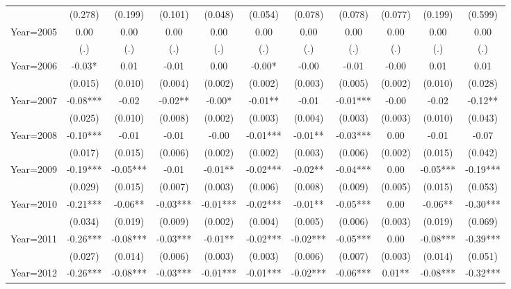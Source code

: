 {\begin{tabular}{l*{10}{c}}
                    &(0.278)   &(0.199)   &(0.101)   &(0.048)   &(0.054)   &(0.078)   &(0.078)   &(0.077)   &(0.199)   &(0.599)   \\
Year=2005           &  0.00   &  0.00   &  0.00   &  0.00   &  0.00   &  0.00   &  0.00   &  0.00   &  0.00   &  0.00   \\
                    &   (.)   &   (.)   &   (.)   &   (.)   &   (.)   &   (.)   &   (.)   &   (.)   &   (.)   &   (.)   \\
Year=2006           & -0.03*  &  0.01   & -0.01   &  0.00   & -0.00*  & -0.00   & -0.01   & -0.00   &  0.01   &  0.01   \\
                    &(0.015)   &(0.010)   &(0.004)   &(0.002)   &(0.002)   &(0.003)   &(0.005)   &(0.002)   &(0.010)   &(0.028)   \\
Year=2007           & -0.08***& -0.02   & -0.02** & -0.00*  & -0.01** & -0.01   & -0.01***& -0.00   & -0.02   & -0.12** \\
                    &(0.025)   &(0.010)   &(0.008)   &(0.002)   &(0.003)   &(0.004)   &(0.003)   &(0.003)   &(0.010)   &(0.043)   \\
Year=2008           & -0.10***& -0.01   & -0.01   & -0.00   & -0.01***& -0.01** & -0.03***&  0.00   & -0.01   & -0.07   \\
                    &(0.017)   &(0.015)   &(0.006)   &(0.002)   &(0.002)   &(0.003)   &(0.006)   &(0.002)   &(0.015)   &(0.042)   \\
Year=2009           & -0.19***& -0.05***& -0.01   & -0.01** & -0.02***& -0.02** & -0.04***&  0.00   & -0.05***& -0.19***\\
                    &(0.029)   &(0.015)   &(0.007)   &(0.003)   &(0.006)   &(0.008)   &(0.009)   &(0.005)   &(0.015)   &(0.053)   \\
Year=2010           & -0.21***& -0.06** & -0.03***& -0.01***& -0.02***& -0.01** & -0.05***&  0.00   & -0.06** & -0.30***\\
                    &(0.034)   &(0.019)   &(0.009)   &(0.002)   &(0.004)   &(0.005)   &(0.006)   &(0.003)   &(0.019)   &(0.069)   \\
Year=2011           & -0.26***& -0.08***& -0.03***& -0.01** & -0.02***& -0.02***& -0.05***&  0.00   & -0.08***& -0.39***\\
                    &(0.027)   &(0.014)   &(0.006)   &(0.003)   &(0.003)   &(0.006)   &(0.007)   &(0.003)   &(0.014)   &(0.051)   \\
Year=2012           & -0.26***& -0.08***& -0.03***& -0.01***& -0.01***& -0.02***& -0.06***&  0.01** & -0.08***& -0.32***\\

\end{tabular}}
